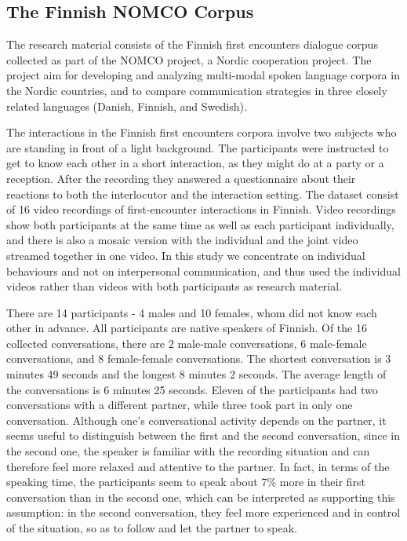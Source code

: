 \documentclass[10pt,journal,compsoc]{IEEEtran}
\begin{document}
\subsection{The Finnish NOMCO Corpus}
\label{sec:finnish-nomco-corpus}
The research material consists of the Finnish first encounters dialogue corpus collected as part of the NOMCO project, a Nordic cooperation project. The project aim for developing and analyzing multi-modal spoken language corpora in the Nordic countries, and to compare communication strategies in three closely related languages (Danish, Finnish, and Swedish).

The interactions in the Finnish first encounters corpora involve two subjects who are standing in front of a light background. The participants were instructed to get to know each other in a short interaction, as they might do at a party or a reception. After the recording they answered a questionnaire about their reactions to both the interlocutor and the interaction setting. The dataset consist of 16 video recordings of first-encounter interactions in Finnish. Video recordings show both participants at the same time as well as each participant individually, and there is also a mosaic version with the individual and the joint video streamed together in one video. In this study we concentrate on individual behaviours and not on interpersonal communication, and thus used the individual videos rather than videos with both participants as research material.

There are 14 participants - 4 males and 10 females, whom did not know each other in advance. All participants are native speakers of Finnish. Of the 16 collected conversations, there are 2 male-male conversations, 6 male-female conversations, and 8 female-female conversations. The shortest conversation is 3 minutes 49 seconds and the longest 8 minutes 2 seconds. The average length of the conversations is 6 minutes 25 seconds. Eleven of the participants had two conversations with a different partner, while three took part in only one conversation. Although one’s conversational activity depends on the partner, it seems useful to distinguish between the first and the second conversation, since in the second one, the speaker is familiar with the recording situation and can therefore feel more relaxed and attentive to the partner. In fact, in terms of the speaking time, the participants seem to speak about 7\% more in their first conversation than in the second one, which can be interpreted as supporting this assumption: in the second conversation, they feel more experienced and in control of the situation, so as to follow and let the partner to speak.
\end{document}
